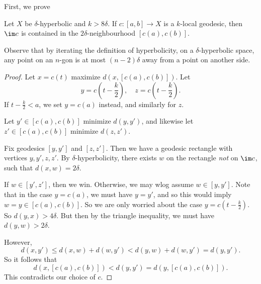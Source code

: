 \documentclass[a4paper]{article}
\begin{document}
First, we prove
\begin{lemma}
  Let $X$ be $\delta$-hyperbolic and $k > 8\delta$. If $c: [a, b] \to X$ is a $k$-local geodesic, then $\im c$ is contained in the $2\delta$-neighbourhood $[c(a), c(b)]$.
\end{lemma}
Observe that by iterating the definition of hyperbolicity, on a $\delta$-hyperbolic space, any point on an $n$-gon is at most $(n - 2)\delta$ away from a point on another side.

\begin{proof}
  Let $x = c(t)$ maximize $d(x, [c(a), c(b)])$. Let
  \[
    y = c\left(t - \frac{k}{2}\right),\quad z = c\left(t - \frac{k}{2}\right).
  \]
  If $t - \frac{k}{2} < a$, we set $y = c(a)$ instead, and similarly for $z$.

  Let $y' \in [c(a), c(b)]$ minimize $d(y, y')$, and likewise let $z' \in [c(a), c(b)]$ minimize $d(z, z')$.

  Fix geodesics $[y, y']$ and $[z, z']$. Then we have a geodesic rectangle with vertices $y, y', z, z'$. By $\delta$-hyperbolicity, there exists $w$ on the rectangle \emph{not} on $\im c$, such that $d(x, w) = 2 \delta$.

  If $w \in [y', z']$, then we win. Otherwise, we may wlog assume $w \in [y, y']$. Note that in the case $y = c(a)$, we must have $y = y'$, and so this would imply $w = y \in [c(a), c(b)]$. So we are only worried about the case $y = c\left(t - \frac{k}{2}\right)$. So $d(y, x) > 4\delta$. But then by the triangle inequality, we must have $d(y, w) > 2\delta$.

  However,
  \[
    d(x, y') \leq d(x, w) + d(w, y') < d(y, w) + d(w, y') = d(y, y').
  \]
  So it follows that
  \[
    d(x, [c(a), c(b)]) < d(y, y') = d(y, [c(a), c(b)]).
  \]
  This contradicts our choice of $c$.
\end{proof}
\end{document}
